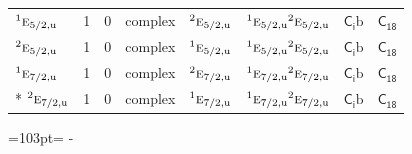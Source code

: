 \documentclass[10pt,a4paper]{article}
\newcommand{\needspace}[1]{\par\penalty-100\begingroup\dimen0=#1\relax\dimen2=\pagegoal
  \advance\dimen2-\pagetotal\ifdim\dimen0>\dimen2\relax\ifdim\dimen2>0pt\vfil\break\fi\fi
  \endgroup}
\numberwithin{equation}{section}
\newcommand{\grp}[1]{\mathsf{#1}}
\newcommand{\irr}[1]{\text{\normalfont\scshape #1}}
\newcommand{\conjpair}[1]{{}^{#1}}
\newcommand{\ptag}[1]{\mathrm{#1}}
\newcommand{\secondclass}{\mathrm{b}}
\begin{document}
{\begin{longtable}{@{}lrrlllll@{}}
$\conjpair{1}\irr{e}_{5/2,\ptag{u}}$ & 1 & $0$ & complex & $\conjpair{2}\irr{e}_{5/2,\ptag{u}}$ & $\conjpair{1}\irr{e}_{5/2,\ptag{u}}\conjpair{2}\irr{e}_{5/2,\ptag{u}}$ & \href{S2b.pdf}{$\grp{C_{i}}\secondclass$} & $\grp{C_{18}}$\\
$\conjpair{2}\irr{e}_{5/2,\ptag{u}}$ & 1 & $0$ & complex & $\conjpair{1}\irr{e}_{5/2,\ptag{u}}$ & $\conjpair{1}\irr{e}_{5/2,\ptag{u}}\conjpair{2}\irr{e}_{5/2,\ptag{u}}$ & \href{S2b.pdf}{$\grp{C_{i}}\secondclass$} & $\grp{C_{18}}$\\
$\conjpair{1}\irr{e}_{7/2,\ptag{u}}$ & 1 & $0$ & complex & $\conjpair{2}\irr{e}_{7/2,\ptag{u}}$ & $\conjpair{1}\irr{e}_{7/2,\ptag{u}}\conjpair{2}\irr{e}_{7/2,\ptag{u}}$ & \href{S2b.pdf}{$\grp{C_{i}}\secondclass$} & $\grp{C_{18}}$\\*
$\conjpair{2}\irr{e}_{7/2,\ptag{u}}$ & 1 & $0$ & complex & $\conjpair{1}\irr{e}_{7/2,\ptag{u}}$ & $\conjpair{1}\irr{e}_{7/2,\ptag{u}}\conjpair{2}\irr{e}_{7/2,\ptag{u}}$ & \href{S2b.pdf}{$\grp{C_{i}}\secondclass$} & $\grp{C_{18}}$\\
\bottomrule\end{longtable}}
\needspace{103pt}
\end{document}
